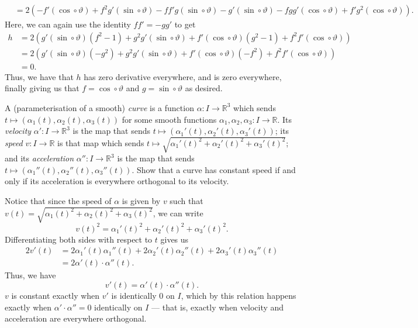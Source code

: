 \documentclass[12 pt, letterpaper]{hmcpset}
\begin{document}
\begin{solution}
\[\begin{split}
			   & = 2( - f' (\cos \circ \vartheta) + f^2 g' (\sin \circ \vartheta) - f f' g (\sin \circ \vartheta) - g' (\sin \circ \vartheta) - f g g' (\cos \circ \vartheta) + f' g^2 (\cos \circ \vartheta) ). 
		\end{split}
	\]
	Here, we can again use the identity $f f' = - g g'$ to get
	\[
		\begin{split}
			h & = 2 (g' (\sin \circ \vartheta) (f^2 - 1) + g^2 g' (\sin \circ \vartheta) + f' (\cos \circ \vartheta) (g^2 - 1) + f^2 f' (\cos \circ \vartheta)) \\
			  & = 2 (g' (\sin \circ \vartheta) (-g^2) + g^2 g' (\sin \circ \vartheta) + f' (\cos \circ \vartheta) (- f^2) + f^2 f' (\cos \circ \vartheta)) \\
			  & = 0.
		\end{split}
	\]
	Thus, we have that $h$ has zero derivative everywhere, and is zero everywhere, finally giving us that $f = \cos \circ \vartheta$ and $g = \sin \circ \vartheta$ as desired.
\end{solution}

\pagebreak

\begin{problem}[Problem 5.]
	A (parameterisation of a smooth) \textit{curve} is a function $\alpha : I \to \mathbb{R}^3$ which sends $t \mapsto (\alpha_1(t), \alpha_2(t), \alpha_3(t))$ for some smooth functions $\alpha_1, \alpha_2, \alpha_3 : I \to \mathbb{R}$. Its \textit{velocity} $\alpha' : I \to \mathbb{R}^3$ is the map that sends $t \mapsto (\alpha_1'(t), \alpha_2'(t), \alpha_3'(t))$; its \textit{speed} $v : I \to \mathbb{R}$ is that map which sends $t \mapsto \sqrt{\alpha_1'(t)^2 + \alpha_2'(t)^2 + \alpha_3'(t)^2}$; and its \textit{acceleration} $\alpha'' : I \to \mathbb{R}^3$ is the map that sends $t \mapsto (\alpha_1''(t), \alpha_2''(t), \alpha_3''(t))$. Show that a curve has constant speed if and only if its acceleration is everywhere orthogonal to its velocity.
\end{problem}

\begin{solution}
	Notice that since the speed of $\alpha$ is given by $v$ such that $v(t) = \sqrt{\alpha_1(t)^2 + \alpha_2(t)^2 + \alpha_3(t)^2}$, we can write
	\[
		v(t)^2 = \alpha_1'(t)^2 + \alpha_2'(t)^2 + \alpha_3'(t)^2.
	\]
	Differentiating both sides with respect to $t$ gives us
	\[
		\begin{split}
			2 v'(t) & = 2 \alpha_1'(t) \alpha_1''(t) + 2 \alpha_2'(t) \alpha_2''(t) + 2 \alpha_3'(t) \alpha_3''(t) \\
				& = 2 \alpha'(t) \cdot \alpha''(t).
		\end{split}
	\]
	Thus, we have
	\[
		v'(t) = \alpha'(t) \cdot \alpha''(t).
	\]
	$v$ is constant exactly when $v'$ is identically $0$ on $I$, which by this relation happens exactly when $\alpha' \cdot \alpha'' = 0$ identically on $I$ --- that is, exactly when velocity and acceleration are everywhere orthogonal.
\end{solution}
\end{document}
